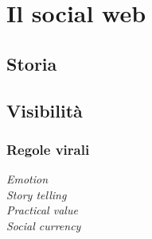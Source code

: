
\chapter{Il social web}

	\section{Storia}
	
	\section{Visibilità}
	
		\subsection{Regole virali}
			
			\begin{description}
				\item[\emph{Emotion}]
				\item[\emph{Story telling}]
				\item[\emph{Practical value}]
				\item[\emph{Social currency}]
			\end{description}